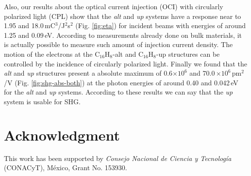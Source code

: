 \documentclass[pss]{wiley2sp} %
\begin{document}
Also, our results about the optical current injection (OCI) with circularly polarized light (CPL)
show that the \emph{alt}  and \emph{up} systems have a response near to 1.95
and 18.0\,mC$^{3}$/J$^{2}$s$^{2}$ (Fig. \ref{fig:eta}) for incident beams with energies of around
1.25 and 0.09\,eV. According to measurements already done on bulk materials, it
is actually possible to measure such amount of injection current density. The motion of the electrons at the
C$_{16}$H$_{8}$-alt and C$_{16}$H$_{8}$-up structures can be controlled by the incidence of circularly
polarized light. Finally we found that the \emph{alt} and \emph{up} structures
present a absolute maximum of 0.6$\times 10^{6}$ and 70.0\,$\times 10^{6}
$\,pm$^{2}$/V (Fig. \ref{fig:shg-abs-both}) at the photon energies of around 0.40 and 0.042\,eV for the \emph{alt} and \emph{up} systems.
According to these results we can say that the \emph{up} system is usable for SHG.


\section{Acknowledgment} %

This work has been supported by \emph{Consejo Nacional de Ciencia y
Tecnolog\'ia} (CONACyT), M\'exico, Grant No. 153930.




\end{document}
